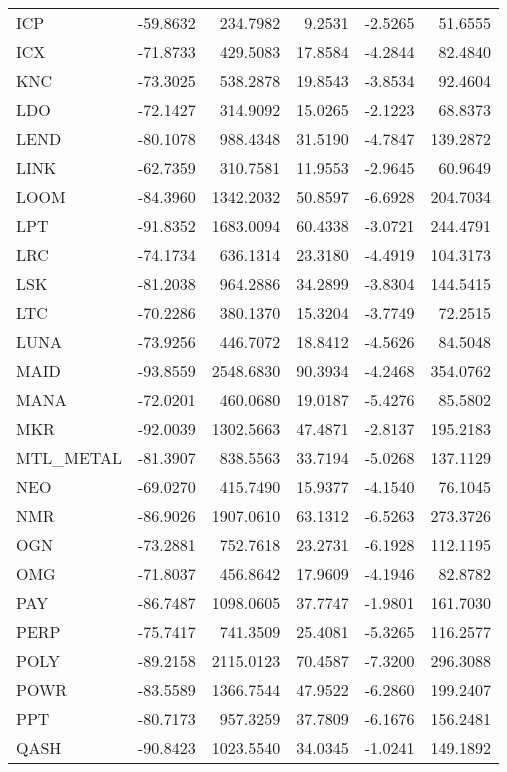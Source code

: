 \begin{table}[ht]
\begin{tabular}{lrrrrr}
ICP & -59.8632 & 234.7982 & 9.2531 & -2.5265 & 51.6555 \\
ICX & -71.8733 & 429.5083 & 17.8584 & -4.2844 & 82.4840 \\
KNC & -73.3025 & 538.2878 & 19.8543 & -3.8534 & 92.4604 \\
LDO & -72.1427 & 314.9092 & 15.0265 & -2.1223 & 68.8373 \\
LEND & -80.1078 & 988.4348 & 31.5190 & -4.7847 & 139.2872 \\
LINK & -62.7359 & 310.7581 & 11.9553 & -2.9645 & 60.9649 \\
LOOM & -84.3960 & 1342.2032 & 50.8597 & -6.6928 & 204.7034 \\
LPT & -91.8352 & 1683.0094 & 60.4338 & -3.0721 & 244.4791 \\
LRC & -74.1734 & 636.1314 & 23.3180 & -4.4919 & 104.3173 \\
LSK & -81.2038 & 964.2886 & 34.2899 & -3.8304 & 144.5415 \\
LTC & -70.2286 & 380.1370 & 15.3204 & -3.7749 & 72.2515 \\
LUNA & -73.9256 & 446.7072 & 18.8412 & -4.5626 & 84.5048 \\
MAID & -93.8559 & 2548.6830 & 90.3934 & -4.2468 & 354.0762 \\
MANA & -72.0201 & 460.0680 & 19.0187 & -5.4276 & 85.5802 \\
MKR & -92.0039 & 1302.5663 & 47.4871 & -2.8137 & 195.2183 \\
MTL_METAL & -81.3907 & 838.5563 & 33.7194 & -5.0268 & 137.1129 \\
NEO & -69.0270 & 415.7490 & 15.9377 & -4.1540 & 76.1045 \\
NMR & -86.9026 & 1907.0610 & 63.1312 & -6.5263 & 273.3726 \\
OGN & -73.2881 & 752.7618 & 23.2731 & -6.1928 & 112.1195 \\
OMG & -71.8037 & 456.8642 & 17.9609 & -4.1946 & 82.8782 \\
PAY & -86.7487 & 1098.0605 & 37.7747 & -1.9801 & 161.7030 \\
PERP & -75.7417 & 741.3509 & 25.4081 & -5.3265 & 116.2577 \\
POLY & -89.2158 & 2115.0123 & 70.4587 & -7.3200 & 296.3088 \\
POWR & -83.5589 & 1366.7544 & 47.9522 & -6.2860 & 199.2407 \\
PPT & -80.7173 & 957.3259 & 37.7809 & -6.1676 & 156.2481 \\
QASH & -90.8423 & 1023.5540 & 34.0345 & -1.0241 & 149.1892 \\

\end{tabular}
\end{table}
